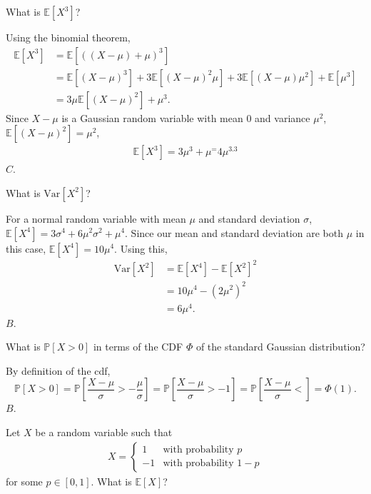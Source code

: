\documentclass[a4paper]{article}
\begin{document}
\begin{Exercise}
	What is $\mathbb{E}[X^3]$?
\end{Exercise}
\begin{Solution}
	Using the binomial theorem,
	\begin{align*}
		\mathbb{E}[X^3] &= \mathbb{E}[((X - \mu) + \mu)^3] 
			     \\ &= \mathbb{E}[(X - \mu)^3] + 3 \mathbb{E}[(X - \mu)^2 \mu] + 3\mathbb{E}[(X - \mu)\mu^2] + \mathbb{E}[\mu^3]
			     \\ &= 3 \mu \mathbb{E}[(X - \mu)^2] + \mu^3.
	\end{align*}
	Since $X - \mu$ is a Gaussian random variable with mean $0$ and variance $\mu^2$, $\mathbb{E}[(X - \mu)^2] = \mu^2$, 
	\begin{align*}
		\mathbb{E}[X^3] = 3 \mu^3 + \mu^ = 4 \mu^3.3
	\end{align*}
	$\boxed{C}$.
\end{Solution}
\begin{Exercise}
	What is $\text{Var}[X^2]$?
\end{Exercise}
\begin{Solution}
	For a normal random variable with mean $\mu$ and standard deviation $\sigma$, $\mathbb{E}[X^4] = 3 \sigma^4 + 6 \mu^2 \sigma^2 + \mu^4$. Since our mean and standard deviation are both $\mu$ in this case, $\mathbb{E}[X^4] = 10 \mu^4.$ Using this, 
	\begin{align*}
		\text{Var}[X^2] &= \mathbb{E}[X^4]- \mathbb{E}[X^2]^2
			     \\ &= 10 \mu^4 - (2 \mu^2)^2
			     \\ &= 6 \mu^4.
	\end{align*}
	$\boxed{B}$.
\end{Solution}
\begin{Exercise}
	What is $\mathbb{P}[X > 0]$ in terms of the CDF $\Phi$ of the standard Gaussian distribution?
\end{Exercise}
\begin{Solution}
	By definition of the cdf, $$\mathbb{P}[X > 0] = \mathbb{P} \left[ \frac{X - \mu}{\sigma} > -\frac{\mu}{\sigma} \right] = \mathbb{P} \left[ \frac{X - \mu}{\sigma} > -1 \right] = \mathbb{P} \left[ \frac{X - \mu}{\sigma} < \right] = \Phi(1).$$
	$\boxed{B}$.
\end{Solution}
\begin{Exercise}
	Let $X$ be a random variable such that
	\begin{align*}
		X = \begin{cases}
			1 & \text{with probability } p \\
			-1 & \text{with probability } 1- p
		\end{cases}
	\end{align*}
	for some $p \in [0, 1]$. What is $\mathbb{E}[X]$?
\end{Exercise}
\end{document}
